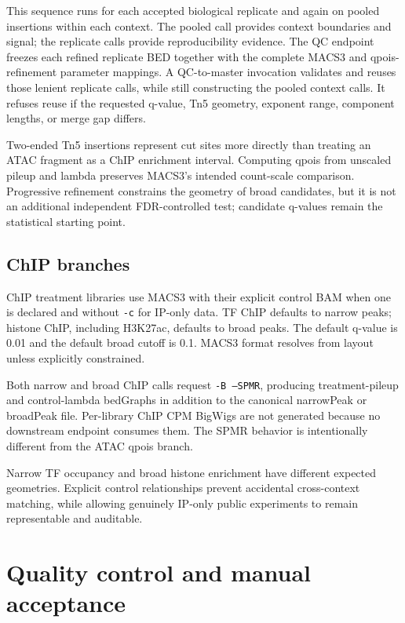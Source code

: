 \documentclass[11pt]{article}
\begin{document}
This sequence runs for each accepted biological replicate and again on pooled
insertions within each context.  The pooled call provides context boundaries
and signal; the replicate calls provide reproducibility evidence.
The QC endpoint freezes each refined replicate BED together with the complete
MACS3 and qpois-refinement parameter mappings.  A QC-to-master invocation
validates and reuses those lenient replicate calls, while still constructing
the pooled context calls.  It refuses reuse if the requested q-value, Tn5
geometry, exponent range, component lengths, or merge gap differs.

Two-ended Tn5 insertions represent cut sites more directly than treating an
ATAC fragment as a ChIP enrichment interval.  Computing qpois from unscaled
pileup and lambda preserves MACS3's intended count-scale comparison.
Progressive refinement constrains the geometry of broad candidates, but it is
not an additional independent FDR-controlled test; candidate q-values remain
the statistical starting point.

\subsection{ChIP branches}

ChIP treatment libraries use MACS3 with their explicit control BAM when one is
declared and without \texttt{-c} for IP-only data.  TF ChIP defaults to narrow
peaks; histone ChIP, including H3K27ac, defaults to broad peaks.  The default
q-value is 0.01 and the default broad cutoff is 0.1.  MACS3 format resolves
from layout unless explicitly constrained.

Both narrow and broad ChIP calls request \texttt{-B --SPMR}, producing
treatment-pileup and control-lambda bedGraphs in addition to the canonical
narrowPeak or broadPeak file.  Per-library ChIP CPM BigWigs are not generated
because no downstream endpoint consumes them.  The SPMR behavior is
intentionally different from the ATAC qpois branch.

Narrow TF occupancy and broad histone enrichment have different expected
geometries.  Explicit control relationships prevent accidental cross-context
matching, while allowing genuinely IP-only public experiments to remain
representable and auditable.

\section{Quality control and manual acceptance}
\end{document}
